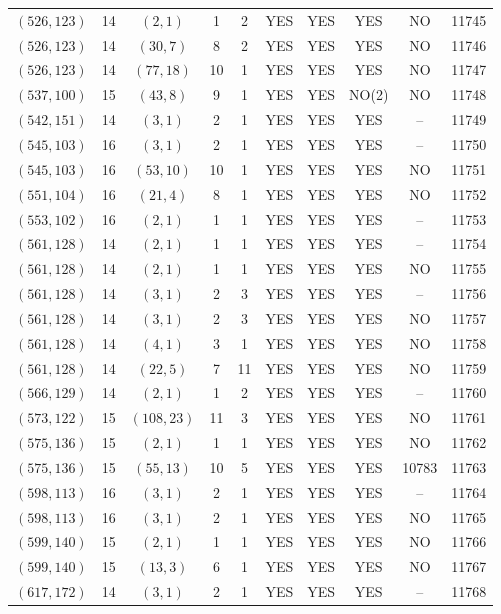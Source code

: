 \begin{longtable}{|c|c|c|c|c|c|c|c|c|c|}
$(526, 123)$ & 14 & $(2, 1)$ & 1 & 2 & YES & YES & YES & NO & 11745\\
$(526, 123)$ & 14 & $(30, 7)$ & 8 & 2 & YES & YES & YES & NO & 11746\\
$(526, 123)$ & 14 & $(77, 18)$ & 10 & 1 & YES & YES & YES & NO & 11747\\
$(537, 100)$ & 15 & $(43, 8)$ & 9 & 1 & YES & YES & NO(2) & NO & 11748\\
$(542, 151)$ & 14 & $(3, 1)$ & 2 & 1 & YES & YES & YES & -- & 11749\\
$(545, 103)$ & 16 & $(3, 1)$ & 2 & 1 & YES & YES & YES & -- & 11750\\
$(545, 103)$ & 16 & $(53, 10)$ & 10 & 1 & YES & YES & YES & NO & 11751\\
$(551, 104)$ & 16 & $(21, 4)$ & 8 & 1 & YES & YES & YES & NO & 11752\\
$(553, 102)$ & 16 & $(2, 1)$ & 1 & 1 & YES & YES & YES & -- & 11753\\
$(561, 128)$ & 14 & $(2, 1)$ & 1 & 1 & YES & YES & YES & -- & 11754\\
$(561, 128)$ & 14 & $(2, 1)$ & 1 & 1 & YES & YES & YES & NO & 11755\\
$(561, 128)$ & 14 & $(3, 1)$ & 2 & 3 & YES & YES & YES & -- & 11756\\
$(561, 128)$ & 14 & $(3, 1)$ & 2 & 3 & YES & YES & YES & NO & 11757\\
$(561, 128)$ & 14 & $(4, 1)$ & 3 & 1 & YES & YES & YES & NO & 11758\\
$(561, 128)$ & 14 & $(22, 5)$ & 7 & 11 & YES & YES & YES & NO & 11759\\
$(566, 129)$ & 14 & $(2, 1)$ & 1 & 2 & YES & YES & YES & -- & 11760\\
$(573, 122)$ & 15 & $(108, 23)$ & 11 & 3 & YES & YES & YES & NO & 11761\\
$(575, 136)$ & 15 & $(2, 1)$ & 1 & 1 & YES & YES & YES & NO & 11762\\
$(575, 136)$ & 15 & $(55, 13)$ & 10 & 5 & YES & YES & YES & 10783 & 11763\\
$(598, 113)$ & 16 & $(3, 1)$ & 2 & 1 & YES & YES & YES & -- & 11764\\
$(598, 113)$ & 16 & $(3, 1)$ & 2 & 1 & YES & YES & YES & NO & 11765\\
$(599, 140)$ & 15 & $(2, 1)$ & 1 & 1 & YES & YES & YES & NO & 11766\\
$(599, 140)$ & 15 & $(13, 3)$ & 6 & 1 & YES & YES & YES & NO & 11767\\
$(617, 172)$ & 14 & $(3, 1)$ & 2 & 1 & YES & YES & YES & -- & 11768\\

\end{longtable}
